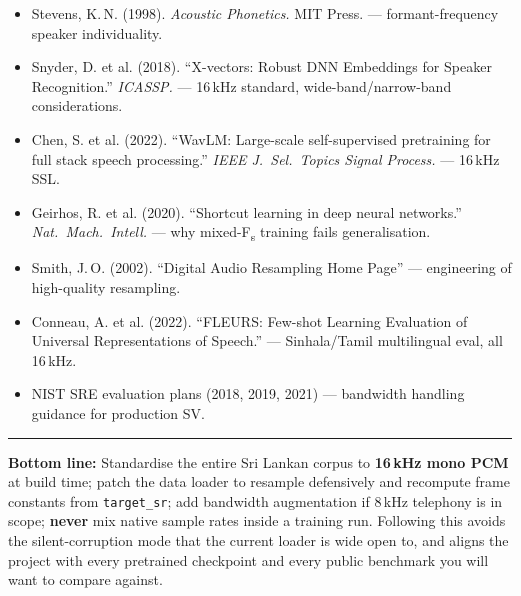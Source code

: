 \documentclass[11pt,a4paper]{article}
\begin{document}
\begin{itemize}[leftmargin=*, label={}]
  \item Stevens, K.\,N. (1998). \textit{Acoustic Phonetics.} MIT Press. --- formant-frequency
    speaker individuality.
  \item Snyder, D. et al. (2018). ``X-vectors: Robust DNN Embeddings for Speaker Recognition.''
    \textit{ICASSP.} --- 16\,kHz standard, wide-band/narrow-band considerations.
  \item Chen, S. et al. (2022). ``WavLM: Large-scale self-supervised pretraining for full stack
    speech processing.'' \textit{IEEE J.\ Sel.\ Topics Signal Process.} --- 16\,kHz SSL.
  \item Geirhos, R. et al. (2020). ``Shortcut learning in deep neural networks.''
    \textit{Nat.\ Mach.\ Intell.} --- why mixed-F\textsubscript{s} training fails generalisation.
  \item Smith, J.\,O. (2002). ``Digital Audio Resampling Home Page'' --- engineering of
    high-quality resampling.
  \item Conneau, A. et al. (2022). ``FLEURS: Few-shot Learning Evaluation of Universal
    Representations of Speech.'' --- Sinhala/Tamil multilingual eval, all 16\,kHz.
  \item NIST SRE evaluation plans (2018, 2019, 2021) --- bandwidth handling guidance for
    production SV.
\end{itemize}

\vspace{12pt}
\rule{\linewidth}{0.8pt}

\noindent\textbf{Bottom line:}
Standardise the entire Sri Lankan corpus to \textbf{16\,kHz mono PCM} at build time; patch the
data loader to resample defensively and recompute frame constants from \texttt{target\_sr}; add
bandwidth augmentation if 8\,kHz telephony is in scope; \textbf{never} mix native sample rates
inside a training run. Following this avoids the silent-corruption mode that the current loader is
wide open to, and aligns the project with every pretrained checkpoint and every public benchmark
you will want to compare against.
\end{document}
